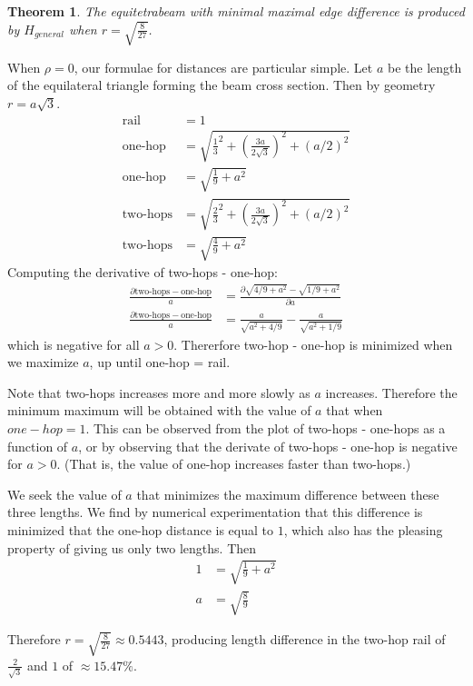 \documentclass[11pt]{article}
\newtheorem{theorem}{Theorem}
\begin{document}
\begin{theorem}
The equitetrabeam with minimal maximal edge difference is produced by $H_{general}$ when $ r = \sqrt{\frac{8}{27}} $.
  \end{theorem}

When $\rho = 0$, our formulae for distances are particular simple. Let $a$ be the length of the equilateral triangle
forming the beam cross section. Then by geometry $r = a \sqrt{3}$.
\begin{align*}
  \text{rail} &=  1 \\
  \text{one-hop} &= \sqrt{\frac{1}{3}^2 + (\frac{3a}{2\sqrt{3}})^2 + (a/2)^2}\\
\text{one-hop}  &= \sqrt{\frac{1}{9} + a^2} \\
    \text{two-hops} &= \sqrt{\frac{2}{3}^2 + (\frac{3a}{2\sqrt{3}})^2 + (a/2)^2}  \\
\text{two-hops}    &= \sqrt{\frac{4}{9} + a^2}
\end{align*}
Computing the derivative of two-hops - one-hop:
\begin{align*}
 \frac{\partial \text{two-hops} - \text{one-hop}}{a} &= \frac{\partial \sqrt{4/9 + a^2} - \sqrt{1/9 + a^2}}{\partial a} \\
  \frac{\partial \text{two-hops} - \text{one-hop}}{a} &= \frac{a}{\sqrt{a^2 + 4/9}} - \frac{a}{\sqrt{ a^2 + 1/9}} 
\end{align*}
which is negative for all $a> 0$. Thererfore two-hop - one-hop
is minimized when we maximize $a$, up until one-hop = rail.

Note that two-hops increases more and more slowly as $a$ increases. Therefore the minimum maximum will
be obtained with the value of $a$ that when $one-hop = 1$. This can be observed from the
plot of two-hops - one-hops as a function of $a$, or by observing that the derivate of two-hops - one-hop
is negative for $a > 0$. (That is, the value of one-hop increases faster than two-hops.) 

We seek the value of $a$ that minimizes the maximum difference between these three lengths. We find
by numerical experimentation that this difference is minimized that the one-hop distance is equal to $1$,
which also has the pleasing property of giving us only two lengths. Then
\begin{align*}
   1  &=  \sqrt{\frac{1}{9} + a^2} \\
     a  &= \sqrt{\frac{8}{9}} 
\end{align*}

Therefore $ r = \sqrt{\frac{8}{27}} \approx 0.5443 $, producing length difference in the two-hop rail of
$\frac{2}{\sqrt{3}}$
and $1$ of $\approx 15.47\% $.
\end{document}

